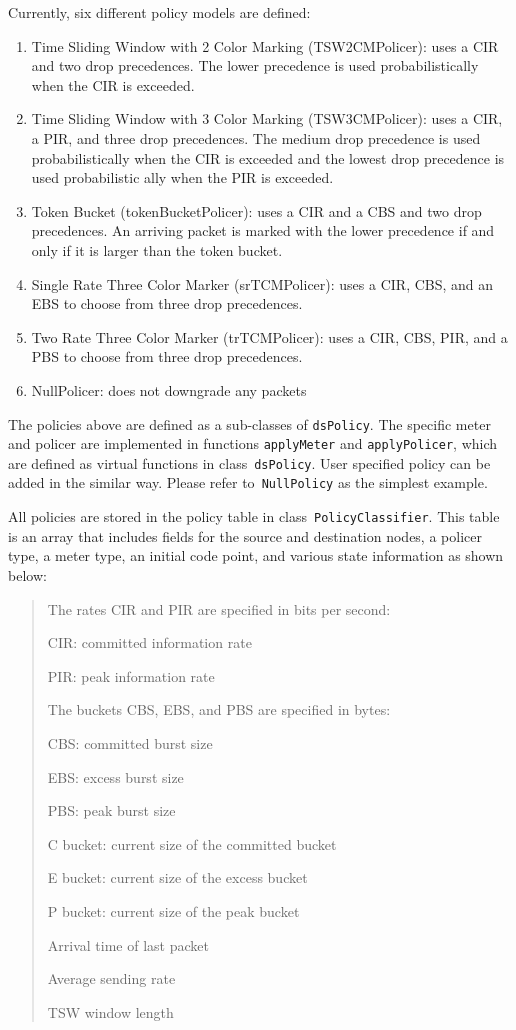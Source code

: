 Currently, six different policy models are defined:
\begin{enumerate}
\item
Time Sliding Window with 2 Color Marking (TSW2CMPolicer): 
  uses a CIR and two drop precedences.  
The lower precedence is used probabilistically when the CIR is exceeded.
\item
Time Sliding Window with 3 Color Marking (TSW3CMPolicer): 
  uses a CIR, a PIR, and three drop precedences.  
The medium drop precedence is used probabilistically 
  when the CIR is exceeded and the lowest drop precedence is used 
  probabilistic ally when the PIR is exceeded.
\item
Token Bucket (tokenBucketPolicer): 
  uses a CIR and a CBS and two drop precedences.  
An arriving packet is marked with the lower precedence if and 
  only if it is larger than the token bucket.
\item
Single Rate Three Color Marker (srTCMPolicer): 
  uses a CIR, CBS, and an EBS to choose from three drop precedences.
\item
Two Rate Three Color Marker (trTCMPolicer): 
  uses a CIR, CBS, PIR, and a PBS to choose from three drop precedences.
\item
NullPolicer: does not downgrade any packets
\end{enumerate}

The policies above are defined as a sub-classes of {\tt dsPolicy}.
The specific meter and policer are implemented in functions 
  {\tt applyMeter} and {\tt applyPolicer},
  which are defined as virtual functions in class~{\tt dsPolicy}.
User specified policy can be added in the similar way.
Please refer to~{\tt NullPolicy} as the simplest example.

All policies are stored in the policy table in class~{\tt PolicyClassifier}.
This table is an array that includes fields for 
  the source and destination nodes, 
  a policer type, a meter type, 
  an initial code point, and various state information as shown below:

\begin{quote}
The rates CIR and PIR are specified in bits per second:

CIR: committed information rate

PIR: peak information rate

The buckets CBS, EBS, and PBS are specified in bytes:

CBS: committed burst size

EBS: excess burst size

PBS: peak burst size

C bucket: current size of the committed bucket

E bucket: current size of the excess bucket

P bucket: current size of the peak bucket

Arrival time of last packet

Average sending rate

TSW window length

\end{quote}

